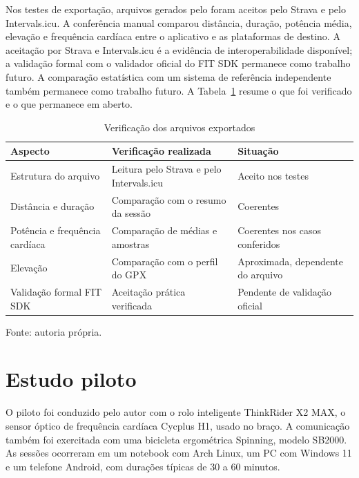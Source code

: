 Nos testes de exportação, arquivos gerados pelo \argus{} foram aceitos pelo
Strava e pelo Intervals.icu. A conferência manual comparou distância, duração,
potência média, elevação e frequência cardíaca entre o aplicativo e as
plataformas de destino. A aceitação por Strava e Intervals.icu é a evidência de
interoperabilidade disponível; a validação formal com o validador oficial do FIT
SDK permanece como trabalho futuro. A comparação estatística com um sistema de
referência independente também permanece como trabalho futuro. A
Tabela~\ref{tab:dados-fit} resume o que
foi verificado e o que permanece em aberto.

\begin{table}[htbp]
    \centering
    \caption{Verificação dos arquivos exportados}
    \label{tab:dados-fit}
    \footnotesize
    \renewcommand{\arraystretch}{1.15}
    \setlength{\tabcolsep}{4pt}
    \begin{tabular}{@{}>{\raggedright\arraybackslash}p{3.8cm}
        >{\raggedright\arraybackslash}p{7.2cm}
        >{\raggedright\arraybackslash}p{3.6cm}@{}}
        \toprule
        \textbf{Aspecto} & \textbf{Verificação realizada} &
        \textbf{Situação} \\
        \midrule
        Estrutura do arquivo & Leitura pelo Strava e pelo Intervals.icu &
        Aceito nos testes \\
        Distância e duração & Comparação com o resumo da sessão &
        Coerentes \\
        Potência e frequência cardíaca & Comparação de médias e amostras &
        Coerentes nos casos conferidos \\
        Elevação & Comparação com o perfil do GPX & Aproximada, dependente do
        arquivo \\
        Validação formal FIT SDK & Aceitação prática verificada &
        Pendente de validação oficial \\
        \bottomrule
    \end{tabular}
    \vspace{0.2cm}
    \par\small Fonte: autoria própria.
\end{table}

\section{Estudo piloto}
\label{sec:piloto-resultados}

O piloto foi conduzido pelo autor com o rolo inteligente ThinkRider X2 MAX, o
sensor óptico de frequência cardíaca Cycplus H1, usado no braço. A comunicação
também foi exercitada com uma bicicleta ergométrica Spinning, modelo SB2000. As
sessões ocorreram em um notebook com Arch Linux, um PC com Windows 11 e um
telefone Android, com durações típicas de 30 a 60 minutos.

